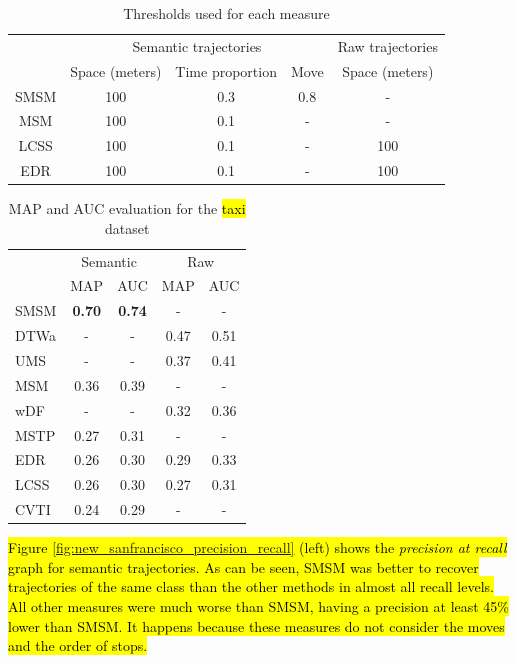 \documentclass[12pt]{article}
\begin{document}
\begin{table}[!h]
\scriptsize
  \centering
  \begin{tabular}{|c|c|c|c|c|}
  	\hline
  & \multicolumn{3}{c|}{Semantic trajectories} & \multicolumn{1}{c|}{Raw trajectories} \\
 	\cline{2-5}
  & Space (meters) & Time proportion & Move & Space (meters) \\
  	\hline
 SMSM & 100 & 0.3 & 0.8 & - \\
 MSM & 100 & 0.1 & - & - \\
 LCSS & 100 & 0.1 & - & 100 \\
 EDR & 100 & 0.1 & - & 100 \\
    \hline
  \end{tabular}
  \caption{Thresholds used for each measure}
  \label{tab:new_san_francisco_thresholds}
\end{table}


\begin{table}[h]
\scriptsize
  \centering
  \begin{tabular}{|l|c|c|c|c|}
  	\hline
 & \multicolumn{2}{c}{Semantic} & \multicolumn{2}{|c|}{Raw} \\
 	\cline{2-5}
 & MAP & AUC & MAP & AUC \\
  	\hline
SMSM & \textbf{0.70} & \textbf{0.74} & - & -\\
DTWa & - & - & 0.47 & 0.51 \\
UMS & - & - & 0.37 & 0.41 \\
MSM & 0.36 & 0.39 & - & - \\
wDF & - & - & 0.32 & 0.36 \\
MSTP & 0.27 & 0.31 & - & - \\
EDR & 0.26 & 0.30 & 0.29 & 0.33 \\
LCSS & 0.26 & 0.30 & 0.27 & 0.31 \\
CVTI & 0.24 & 0.29 & - & - \\
    \hline
  \end{tabular}
  \caption{MAP and AUC evaluation for the \hl{taxi} dataset}
  \label{tab:new_sanfrancisco_measures_map_auc}
\end{table}


\hl{Figure {\ref{fig:new_sanfrancisco_precision_recall}} (left) shows the \emph{precision at recall} graph for semantic trajectories. As can be seen, SMSM was better to recover trajectories of the same class than the other methods in almost all recall levels. All other measures were much worse than SMSM, having a precision at least 45\% lower than SMSM. It happens because these measures do not consider the moves and the order of stops.}
\end{document}

